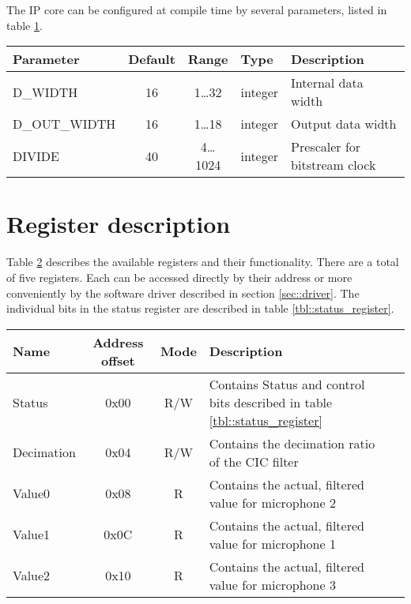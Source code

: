 The IP core can be configured at compile time by several parameters, listed in table \ref{tbl::parameters}.
\begin{table}[h]
	\centering
	\label{tbl::parameters}
	\begin{tabular}{|l|c|c|l|l|}
		\hline 
		Parameter & Default & Range & Type & Description \\ 
		\hline 
		D\_WIDTH & 16 & 1\ldots32 & integer & Internal data width \\
		\hline 
		D\_OUT\_WIDTH & 16 & 1\ldots18 & integer & Output data width \\
		\hline 
		DIVIDE & 40 & 4\ldots1024 & integer & Prescaler for bitstream clock \\
		\hline 
	\end{tabular} 
\end{table}

\newpage

\section{Register description}
\label{sec::registers}
Table \ref{tbl::register_space} describes the available registers and their functionality.
There are a total of five registers.
Each can be accessed directly by their address or more conveniently by the software driver described in section \ref{sec::driver}.
The individual bits in the status register are described in table  \ref{tbl::status_register}.

\begin{table}[h]
	\centering
	\label{tbl::register_space}
	\begin{tabular}{|l|c|c|l|l|}
		\hline 
		Name & Address offset & Mode & Description \\
		\hline 
		Status & 0x00 & R/W & Contains Status and control bits described in table \ref{tbl::status_register} \\
		\hline 
		Decimation & 0x04 & R/W & Contains the decimation ratio of the CIC filter \\
		\hline 
		Value0 & 0x08 & R & Contains the actual, filtered value for microphone 2 \\
		\hline 
		Value1 & 0x0C & R & Contains the actual, filtered value for microphone 1 \\
		\hline 
		Value2 & 0x10 & R & Contains the actual, filtered value for microphone 3 \\
		\hline 
	\end{tabular} 
\end{table}

